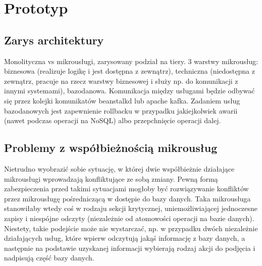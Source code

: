 \documentclass[licencjacka]{pracamgr}
\begin{document}

\chapter{Prototyp}\label{r:prototyp}

\section{Zarys architektury}
Monolityczna vs mikrousługi, zarysowany podział na tiery.
3 warstwy mikrousług: biznesowa (realizuje logikę i jest dostępna z zewnątrz),
techniczna (niedostępna z zewnątrz, pracuje na rzecz warstwy biznesowej i służy np. do komunikacji
z innymi systemami), bazodanowa. Komunikacja między usługami będzie odbywać się przez kolejki komunikatów beanstalkd lub apache kafka.
Zadaniem usług bazodanowych jest zapewnienie rollbacku w przypadku jakiejkolwiek awarii (nawet podczas operacji na NoSQL) albo przepchnięcie operacji dalej.

\section{Problemy z współbieżnością mikrousług}

Nietrudno wyobrazić sobie sytuację, w której dwie współbieżnie działające mikrousługi
wprowadzają konfliktujące ze sobą zmiany. Pewną formą zabezpieczenia przed takimi sytuacjami
mogłoby być rozwiązywanie konfliktów przez mikrousługę pośredniczącą w dostępie do bazy danych.
Taka mikrousługa stanowiłaby wtedy coś w rodzaju sekcji krytycznej, uniemożliwiającej jednoczesne zapisy
i niespójne odczyty (niezależnie od atomowości operacji na bazie danych). 
Niestety, takie podejście może nie wystarczać, np. w przypadku dwóch niezależnie działających usług, które wpierw
odczytują jakąś informację z bazy danych, a następnie na podstawie uzyskanej informacji wybierają rodzaj
akcji do podjęcia i nadpisują część bazy danych.
\end{document}
